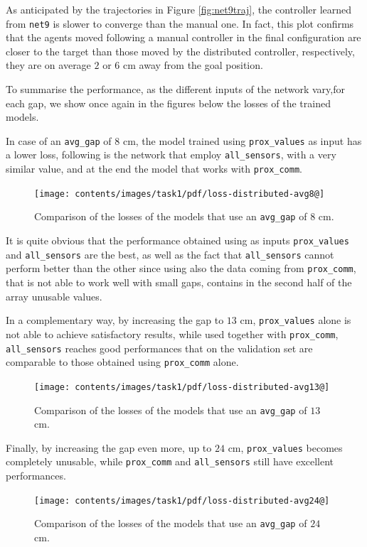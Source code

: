 As anticipated by the trajectories in Figure \ref{fig:net9traj}, the controller 
learned from \texttt{net9} is slower to converge than the manual one. In fact, 
this plot confirms that the agents moved following a manual controller in the final 
configuration are closer to the target than those moved by the distributed 
controller, respectively, they are on average $2$ or $6$ \gls{cm} away from the 
goal position.

To summarise the performance, as the different inputs of the network vary,for 
each gap, we show once again in the figures below the losses of the trained 
models.

In case of an \texttt{avg\_gap} of $8$ \gls{cm}, the model trained using 
\texttt{prox\_values} as input has a lower loss, following is the network that 
employ \texttt{all\_sensors}, with a very similar value, and at the end the model 
that works with \texttt{prox\_comm}.
\begin{figure}[!htb]
	\centering
	\texttt{[image: contents/images/task1/pdf/loss-distributed-avg8@]}%
	\caption{Comparison of the losses of the models that use an \texttt{avg\_gap} 
		of $8$ \gls{cm}.}
	\label{fig:distloss8}
\end{figure}
It is quite obvious that the performance obtained using as inputs 
\texttt{prox\_values} and \texttt{all\_sensors} are the best, as well as the fact that 
\texttt{all\_sensors} cannot perform better than the other since using also the 
data coming from \texttt{prox\_comm}, that is not able to work well with small 
gaps, contains in the second half of the array unusable values.

In a complementary way, by increasing the gap to $13$ \gls{cm},  
\texttt{prox\_values} alone is not able to achieve satisfactory results, while used 
together with \texttt{prox\_comm}, \texttt{all\_sensors} reaches good 
performances that on the validation set are comparable to those obtained using 
\texttt{prox\_comm} alone.
\begin{figure}[!htb]
	\centering
	\texttt{[image: contents/images/task1/pdf/loss-distributed-avg13@]}%
	\caption{Comparison of the losses of the models that use an \texttt{avg\_gap} 
		of $13$ \gls{cm}.}
	\label{fig:distloss13}
\end{figure}

Finally, by increasing the gap even more, up to $24$ \gls{cm}, 
\texttt{prox\_values} becomes completely unusable, while \texttt{prox\_comm} 
and \texttt{all\_sensors} still have excellent performances.
\begin{figure}[!htb]
	\centering
	\texttt{[image: contents/images/task1/pdf/loss-distributed-avg24@]}%
	\caption{Comparison of the losses of the models that use an \texttt{avg\_gap} 
	of $24$ \gls{cm}.}
	\label{fig:distloss24}
\end{figure}

